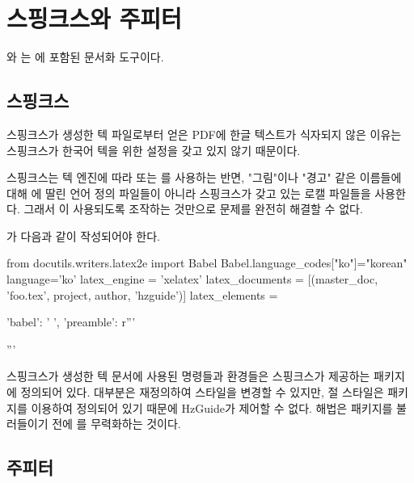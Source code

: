 \chapter{스핑크스와 주피터}

와 는 에 포함된 문서화 도구이다.

\section{스핑크스}

스핑크스가 생성한 텍 파일로부터 얻은 PDF에 한글 텍스트가 식자되지 않은 이유는 스핑크스가 한국어 텍을 위한 설정을 갖고 있지 않기 때문이다.

스핑크스는 텍 엔진에 따라  또는 를 사용하는 반면, "그림"이나 "경고" 같은 이름들에 대해 에 딸린 언어 정의 파일들이 아니라 스핑크스가 갖고 있는 로캘 파일들을 사용한다. 
그래서 이 사용되도록 조작하는 것만으로 문제를 완전히 해결할 수 없다.

가 다음과 같이 작성되어야 한다.

\begin{codewrite}
from docutils.writers.latex2e import Babel
Babel.language_codes["ko"]="korean"
language='ko'
latex_engine = 'xelatex'
latex_documents = [(master_doc, 'foo.tex', project, author, 'hzguide')]
latex_elements = {
    'babel': ' ',
    'preamble': r'''
        \usepackage{kotex}
        \usepackage{…}
        \setmainfont{…}
        '''
}
\end{codewrite}
\pythonread

스핑크스가 생성한 텍 문서에 사용된 명령들과 환경들은 스핑크스가 제공하는  패키지에 정의되어 있다.
대부분은 재정의하여 스타일을 변경할 수 있지만, 절 스타일은  패키지를 이용하여 정의되어 있기 때문에 HzGuide가 제어할 수 없다.
해법은  패키지를 불러들이기 전에 를 무력화하는 것이다.


\section{주피터}

